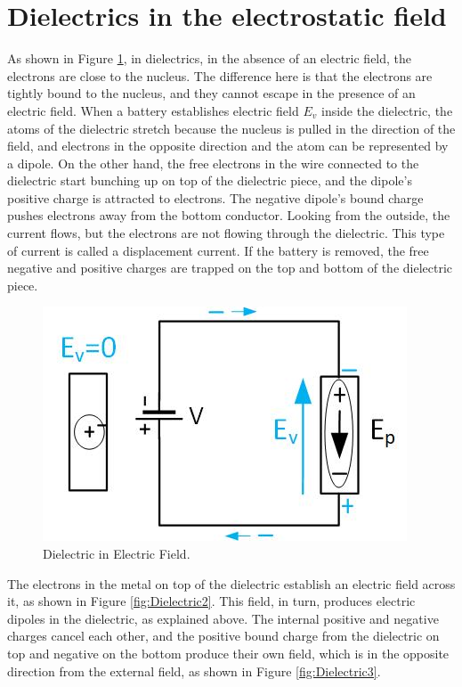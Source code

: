 \documentclass{ximera}
\begin{document}
\section{Dielectrics in the electrostatic field}

As shown in Figure \ref{fig:Dielectric1}, in dielectrics, in the absence of an electric field, the electrons are close to the nucleus. The difference here is that the electrons are tightly bound to the nucleus, and they cannot escape in the presence of an electric field. When a battery establishes electric field $E_v$ inside the dielectric, the atoms of the dielectric stretch because the nucleus is pulled in the direction of the field, and electrons in the opposite direction and the atom can be represented by a dipole. On the other hand, the free electrons in the wire connected to the dielectric start bunching up on top of the dielectric piece, and the dipole's positive charge is attracted to electrons. The negative dipole's bound charge pushes electrons away from the bottom conductor. Looking from the outside, the current flows, but the electrons are not flowing through the dielectric. This type of current is called a displacement current. If the battery is removed, the free negative and positive charges are trapped on the top and bottom of the dielectric piece. 

\begin{figure}[htbp]
\begin{center}
\includegraphics[scale=1]{../jpg/dielectricConductor.jpg}
\end{center}
\caption{Dielectric in Electric Field.}
\label{fig:Dielectric1}
\end{figure}

The electrons in the metal on top of the dielectric establish an electric field across it, as shown in Figure \ref{fig:Dielectric2}. This field, in turn, produces electric dipoles in the dielectric, as explained above. The internal positive and negative charges cancel each other, and the positive bound charge from the dielectric on top and negative on the bottom produce their own field, which is in the opposite direction from the external field, as shown in Figure \ref{fig:Dielectric3}.
\end{document}

